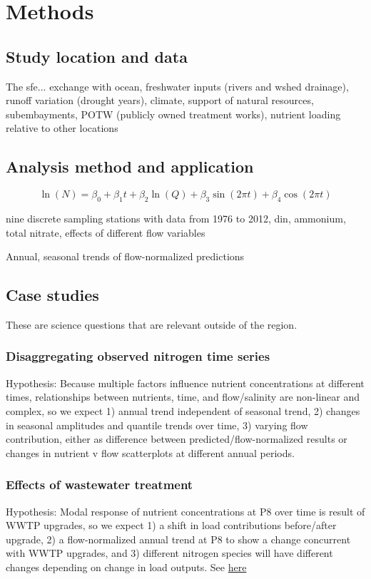 \documentclass[letterpaper,12pt,oneside]{article}\usepackage[]{graphicx}\usepackage[]{color}
\begin{document}
\section{Methods}

\subsection{Study location and data}

The \ac{sfe}... exchange with ocean, freshwater inputs (rivers and wshed drainage), runoff variation (drought years), climate, support of natural resources, subembayments, POTW (publicly owned treatment works), nutrient loading relative to other locations
\subsection{Analysis method and application}

\begin{equation}
\ln\left(N\right) = \beta_0 + \beta_1 t + \beta_2 \ln\left(Q\right) + \beta_3 \sin\left(2\pi t\right) + \beta_4 \cos\left(2\pi t\right)
\end{equation}

nine discrete sampling stations with data from 1976 to 2012, \ac{din}, ammonium, total nitrate, effects of different flow variables

Annual, seasonal trends of flow-normalized predictions

\subsection{Case studies}
These are science questions that are relevant outside of the region.
\subsubsection{Disaggregating observed nitrogen time series}
Hypothesis: Because multiple factors influence nutrient concentrations at different times, relationships between nutrients, time, and flow/salinity are non-linear and complex, so we expect 1) annual trend independent of seasonal trend, 2) changes in seasonal amplitudes and quantile trends over time, 3) varying flow contribution, either as difference between predicted/flow-normalized results or changes in nutrient v flow scatterplots at different annual periods.
\subsubsection{Effects of wastewater treatment}
Hypothesis: Modal response of nutrient concentrations at P8 over time is result of WWTP upgrades, so we expect 1) a shift in load contributions before/after upgrade, 2) a flow-normalized annual trend at P8 to show a change concurrent with WWTP upgrades, and 3) different nitrogen species will have different changes depending on change in load outputs. See \href{http://www.waterboards.ca.gov/centralvalley/board_decisions/adopted_orders/san_joaquin/r5-2008-0086_res.pdf}{here}
\end{document}
